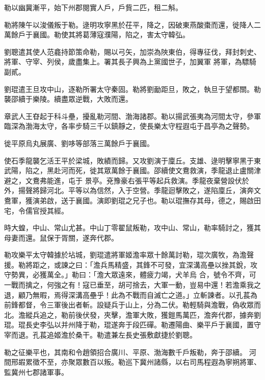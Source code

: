 \begin{pinyinscope}
 勒以幽冀漸平，始下州郡閱實人戶，戶貲二匹，租二斛。



 勒將陳午以浚儀叛于勒。逯明攻寧黑於茌平，降之，因破東燕酸棗而還，徙降人二萬餘戶于襄國。勒使其將葛薄寇濮陽，陷之，害太守韓弘。



 劉聰遣其使人范龕持節策命勒，賜以弓矢，加崇為陜東伯，得專征伐，拜封刺史、將軍、守宰、列侯，歲盡集上。署其長子興為上黨國世子，加翼軍
 將軍，為驃騎副貳。



 劉琨遣王旦攻中山，逐勒所署太守秦固。勒將劉勔距旦，敗之，執旦于望都關。勒襲邵續于樂陵。續盡眾逆戰，大敗而還。



 章武人王昚起于科斗壘，擾亂勒河間、渤海諸郡。勒以揚武張夷為河間太守，參軍臨深為渤海太守，各率步騎三千以鎮靜之，使長樂太守程遐屯于昌亭為之聲勢。



 徙平原烏丸展廣、劉哆等部落三萬餘戶于襄國。



 使石季龍襲乞活王平於梁城，敗績而歸。又攻劉演于廩丘。支雄、逯明擊寧黑于東武陽，陷之，黑赴河而死，徙其眾萬餘于襄國。邵續使文鴦救演，季龍退止盧關津避之，文鴦弗能進，屯于
 景亭。兗豫豪右張平等起兵救演。季龍夜棄營設伏於外，揚聲將歸河北。平等以為信然，入于空營。季龍迴擊敗之，遂陷廩丘，演奔文鴦軍，獲演弟啟，送于襄國。演即劉琨之兄子也。勒以琨撫存其母，德之，賜啟田宅，令儒官授其經。



 時大蝗，中山、常山尤甚。中山丁零翟鼠叛勒，攻中山、常山，勒率騎討之，獲其母妻而還。鼠保于胥關，遂奔代郡。



 勒攻樂平太守韓據於坫城，劉琨遣將軍姬澹率眾十餘萬討勒，琨次廣牧，為澹聲援。勒將距之，或諫之曰：「澹兵馬精盛，其鋒不可發，宜深溝高壘以挫其銳，攻守勢異，必獲萬全。」勒曰：「澹大眾遠來，體疲力竭，犬羊烏
 合，號令不齊，可一戰而擒之，何強之有！寇已垂至，胡可捨去，大軍一動，豈易中還！若澹乘我之退，顧乃無暇，焉得深溝高壘乎！此為不戰而自滅亡之道。」立斬諫者。以孔萇為前鋒都督，令三軍後出者斬。設疑兵于山上，分為二伏。勒輕騎與澹戰，偽收眾而北。澹縱兵追之，勒前後伏發，夾擊，澹軍大敗，獲鎧馬萬匹，澹奔代郡，據奔劉琨。琨長史李弘以并州降于勒，琨遂奔于段匹磾。勒遷陽曲、樂平戶于襄國，置守宰而退。孔萇追姬澹於桑干。勒遣兼左長史張敷獻捷於劉聰。



 勒之征樂平也，其南和令趙領招合廣川、平原、渤海數千戶叛勒，奔于邵續。
 河間邢嘏累徵不至，亦聚眾數百以叛。勒巡下冀州諸縣，以右司馬程遐為寧朔將軍、監冀州七郡諸軍事。




\end{pinyinscope}
